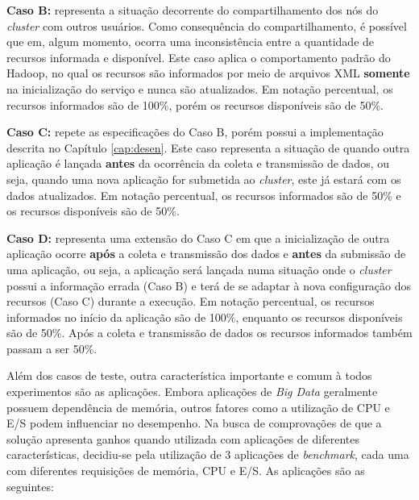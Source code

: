 \textbf{Caso B:} representa a situação decorrente do compartilhamento dos nós do \textit{cluster} com outros usuários. Como consequência do compartilhamento, é possível que em, algum momento, ocorra uma inconsistência entre a quantidade de recursos informada e disponível. Este caso aplica o comportamento padrão do Hadoop, no qual os recursos são informados por meio de arquivos XML \textbf{somente} na inicialização do serviço e nunca são atualizados. Em notação percentual, os recursos informados são de 100\%, porém os recursos disponíveis são de 50\%.

\textbf{Caso C:} repete as especificações do Caso B, porém possui a implementação descrita no Capítulo \ref{cap:desen}. Este caso representa a situação de quando outra aplicação é lançada \textbf{antes} da ocorrência da coleta e transmissão de dados, ou seja, quando uma nova aplicação for submetida ao \textit{cluster}, este já estará com os dados atualizados. Em notação percentual, os recursos informados são de 50\% e os recursos disponíveis são de 50\%.

\textbf{Caso D:} representa uma extensão do Caso C em que a inicialização de outra aplicação ocorre \textbf{após} a coleta e transmissão dos dados e \textbf{antes} da submissão de uma aplicação, ou seja, a aplicação será lançada numa situação onde o \textit{cluster} possui a informação errada (Caso B) e terá de se adaptar à nova configuração dos recursos (Caso C) durante a execução. Em notação percentual, os recursos informados no início da aplicação são de 100\%, enquanto os recursos disponíveis são de 50\%. Após a coleta e transmissão de dados os recursos informados também passam a ser 50\%.

Além dos casos de teste, outra característica importante e comum à todos experimentos são as aplicações. Embora aplicações de \textit{Big Data} geralmente possuem dependência de memória, outros fatores como a utilização de CPU e E/S podem influenciar no desempenho. Na busca de comprovações de que a solução apresenta ganhos quando utilizada com aplicações de diferentes características, decidiu-se pela utilização de 3 aplicações de \textit{benchmark}, cada uma com diferentes requisições de memória, CPU e E/S. As aplicações são as seguintes:

